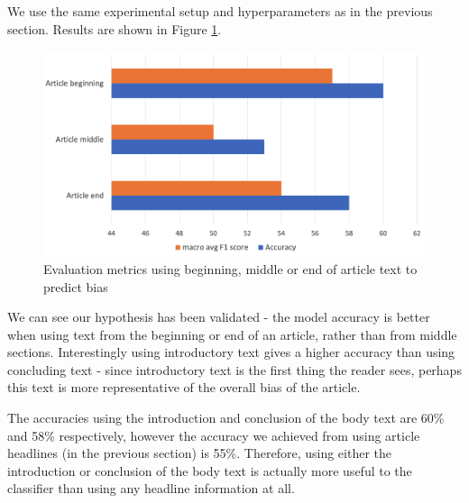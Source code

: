 We use the same experimental setup and hyperparameters as in the previous section. Results are shown in Figure \ref{fig:nmr-beginning-middle-end}.

\begin{figure}
    \centering
    \includegraphics[scale=0.33]{0-img/nmr-beginning-middle-end.png}
    \caption{Evaluation metrics using beginning, middle or end of article text to predict bias}
    \label{fig:nmr-beginning-middle-end}
\end{figure}

We can see our hypothesis has been validated - the model accuracy is better when using text from the beginning or end of an article, rather than from middle sections. Interestingly using introductory text gives a higher accuracy than using concluding text - since introductory text is the first thing the reader sees, perhaps this text is more representative of the overall bias of the article.

The accuracies using the introduction and conclusion of the body text are 60\% and 58\% respectively, however the accuracy we achieved from using article headlines (in the previous section) is 55\%. Therefore, using either the introduction or conclusion of the body text is actually more useful to the classifier than using any headline information at all.